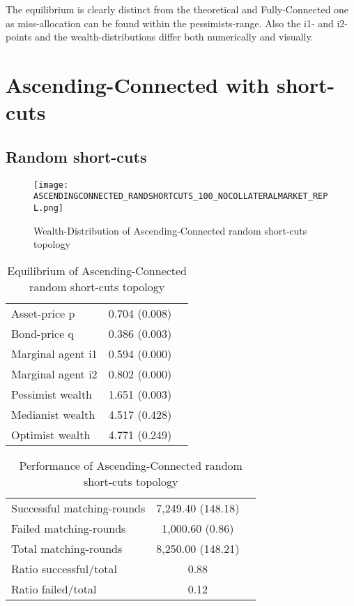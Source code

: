 \documentclass[Bachelorarbeit.tex]{subfiles}
\begin{document}
The equilibrium is clearly distinct from the theoretical and Fully-Connected one as miss-allocation can be found within the pessimists-range. Also the i1- and i2-points and the wealth-distributions differ both numerically and visually. 

\section{Ascending-Connected with short-cuts}
\label{app:results_acShortCuts}

\subsection{Random short-cuts}
\begin{figure}[H]
	\centering
  \texttt{[image: ASCENDINGCONNECTED\_RANDSHORTCUTS\_100\_NOCOLLATERALMARKET\_REPL.png]}
	\caption{Wealth-Distribution of Ascending-Connected random short-cuts topology}
	\label{fig:wealth_ASCENDINGCONNECTED_RANDSHORTCUTS_100_NOCOLLATERALMARKET_REPL}
\end{figure}

\begin{table}[H]
	\caption{Equilibrium of Ascending-Connected random short-cuts topology}
	\centering
	\begin{tabular} { l c r }
		\hline
		Asset-price p & 0.704 (0.008) \\
		Bond-price q & 0.386 (0.003) \\
		Marginal agent i1 & 0.594 (0.000) \\
		Marginal agent i2 & 0.802 (0.000) \\
		\hline
		Pessimist wealth & 1.651 (0.003) \\
		Medianist wealth & 4.517 (0.428) \\
		Optimist wealth & 4.771 (0.249) \\
		\hline
	\end{tabular}
\end{table} 

\begin{table}[H]
	\caption{Performance of Ascending-Connected random short-cuts topology}
	\centering
	\begin{tabular} { l c r }
		\hline
		Successful matching-rounds & 7,249.40 (148.18) \\
		Failed matching-rounds & 1,000.60 (0.86) \\
		Total matching-rounds & 8,250.00 (148.21) \\
		\hline
		Ratio successful/total & 0.88 \\
		Ratio failed/total & 0.12 \\
		\hline
	\end{tabular}
\end{table}
\end{document}
